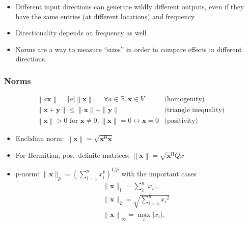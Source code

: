 
\begin{itemize}
    \item Different input directions can generate wildly different outputs, even if they have the same entries (at different locations) and frequency
    \item Directionality depends on frequency as well
    \item Norms are a way to measure ``sizes'' in order to compare effects in different directions.
\end{itemize}

\subsubsection{Norms}

\begin{align*}
     & \left\| a\mathbf{x}\right\|  =\left|a\right|\left\|\mathbf{x}\right\|,\quad\forall a\in\mathbb{R},\mathbf{x}\in V                 & \text{(homogenity)}          \\
     & \|\mathbf{x}+\mathbf{y}\|                         \leq\|\mathbf{x}\|+\|\mathbf{y}\|                                               & \text{(triangle inequality)} \\
     & \left\|\mathbf{x}\right\|                >0 \text{ for } \mathbf{x}\neq0, \left\|\mathbf{x}\right\|=0\leftrightarrow \mathbf{x}=0 & \text{(positivity)}
\end{align*}

\begin{itemize}
    \item Euclidian norm: $\left\|\mathbf{x}\right\|=\sqrt{\mathbf{x}^{\mathsf{H}}\mathbf{x}}$
    \item For Hermitian, pos.\ definite matrices: $\left\|\mathbf{x}\right\|=\sqrt{\mathbf{x}^{\mathsf{H}} Qx}$
    \item p-norm: $\|\mathbf{x}\|_p{=\left(\sum_{i=1}^n x_i^p\right)}^{1/p}$ with the important cases
          \begin{align*}
               & \|\mathbf{x}\|_1=\sum_1^n\left|x_i\right|,               \\
               & \|\mathbf{x}\|_2=\sqrt{\sum_{i=1}^n {x_i}^2}             \\
               & \left\|\mathbf{x}\right\|_\infty=\max_i\left|x_i\right|.
          \end{align*}
\end{itemize}

